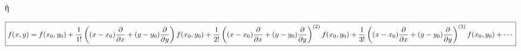 \documentclass[a4paper,landscape]{article}
\begin{document}
    \begin{center}
      ή 
    \end{center}

    \begin{equation*}
      \boxed{f(x,y)=f(x_{0}, y_{0}) + \frac{1}{1!} \left((x- x_{0})
        \pdv{x}+ (y- y_{0})\pdv{y}\right) f(x_{0}, y_{0})
        + \frac{1}{2!} \left((x- x_{0})
        \pdv{x}+ (y- y_{0})\pdv{y}\right)^{(2)}f(x_{0}, y_{0} ) 
        + \frac{1}{3!} \left((x- x_{0})
      \pdv{x}+ (y- y_{0})\pdv{y}\right)^{(3)}f(x_{0}, y_{0}) + \cdots}
    \end{equation*}
    
\end{document}
